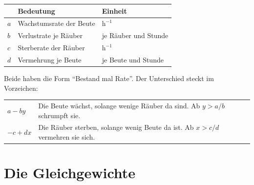 \begin{merksatz}
\begin{center}
{\small
\renewcommand{\arraystretch}{1.5}
\begin{tabular}{@{}P{1.2cm}P{3.2cm}P{3.6cm}@{}}
\toprule
& \textbf{Bedeutung} & \textbf{Einheit}\\
\midrule
$a$ & Wachstumsrate der Beute & $\mathrm{h}^{-1}$\\
$b$ & Verlustrate je Räuber & je Räuber und Stunde\\
$c$ & Sterberate der Räuber & $\mathrm{h}^{-1}$\\
$d$ & Vermehrung je Beute & je Beute und Stunde\\
\bottomrule
\end{tabular}}
\end{center}

Beide haben die Form \enquote{Bestand mal Rate}. Der Unterschied steckt im Vorzeichen:

\begin{center}
\renewcommand{\arraystretch}{1.5}
\begin{tabular}{@{}P{2.4cm}P{6.2cm}@{}}
\toprule
$a - by$ & Die Beute wächst, solange wenige Räuber da sind. Ab $y > a/b$ schrumpft sie.\\
$-c + dx$ & Die Räuber sterben, solange wenig Beute da ist. Ab $x > c/d$ vermehren sie sich.\\
\bottomrule
\end{tabular}
\end{center}

\begin{center}
\begin{minipage}{0.88\textwidth}
\end{minipage}
\end{center}
\end{merksatz}

\section{Die Gleichgewichte}

